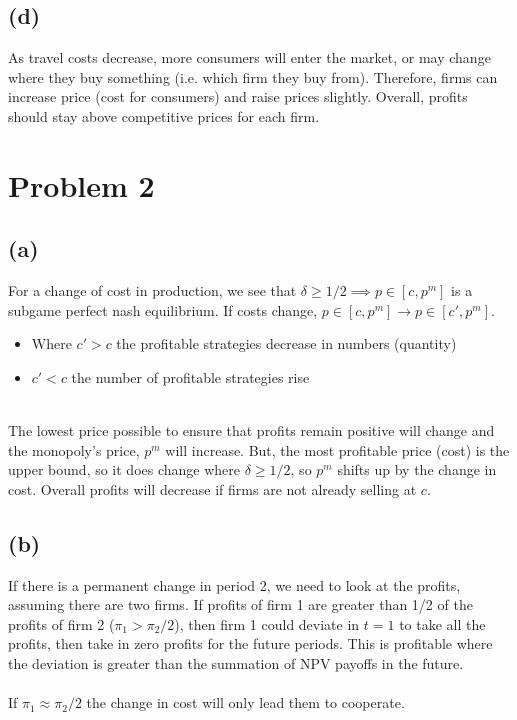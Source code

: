 \documentclass{article}
\begin{document}
\subsection*{(d)}

As travel costs decrease, more consumers will enter the market, or may change where they buy something (i.e. which firm they buy from). Therefore, firms can increase price (cost for consumers) and raise prices slightly. Overall, profits should stay above competitive prices for each firm. 

\section{Problem 2}
\subsection*{(a)}
For a change of cost in production, we see that $\delta \geq 1/2 \implies p \in [c, p^m]$ is a subgame perfect nash equilibrium. If costs change, $p \in [c, p^m] \rightarrow p \in [c', p^m]$. 

\begin{itemize}
    \item Where $c' > c$ the profitable strategies decrease in numbers (quantity)
    \item $c' < c$ the number of profitable strategies rise
\end{itemize}
\\
The lowest price possible to ensure that profits remain positive will change and the monopoly's price, $p^m$ will increase. But, the most profitable price (cost) is the upper bound, so it does change where $\delta \geq 1/2$, so $p^m$ shifts up by the change in cost. Overall profits will decrease if firms are not already selling at $c$. 

\subsection*{(b)}
If there is a permanent change in period 2, we need to look at the profits, assuming there are two firms. If profits of firm 1 are greater than 1/2 of the profits of firm 2 ($\pi_1 > \pi_2/2$), then firm 1 could deviate in $t=1$ to take all the profits, then take in zero profits for the future periods. This is profitable where the deviation is greater than the summation of NPV payoffs in the future. 
\\
\\
If $\pi_1 \approx \pi_2/2$ the change in cost will only lead them to cooperate. 
\end{document}
